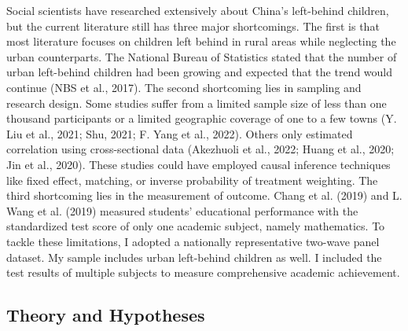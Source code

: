 \documentclass[
  man,floatsintext]{apa7}
\begin{document}
Social scientists have researched extensively about China's left-behind children, but the current literature still has three major shortcomings. The first is that most literature focuses on children left behind in rural areas while neglecting the urban counterparts. The National Bureau of Statistics stated that the number of urban left-behind children had been growing and expected that the trend would continue (NBS et al., 2017). The second shortcoming lies in sampling and research design. Some studies suffer from a limited sample size of less than one thousand participants or a limited geographic coverage of one to a few towns (Y. Liu et al., 2021; Shu, 2021; F. Yang et al., 2022). Others only estimated correlation using cross-sectional data (Akezhuoli et al., 2022; Huang et al., 2020; Jin et al., 2020). These studies could have employed causal inference techniques like fixed effect, matching, or inverse probability of treatment weighting. The third shortcoming lies in the measurement of outcome. Chang et al. (2019) and L. Wang et al. (2019) measured students' educational performance with the standardized test score of only one academic subject, namely mathematics. To tackle these limitations, I adopted a nationally representative two-wave panel dataset. My sample includes urban left-behind children as well. I included the test results of multiple subjects to measure comprehensive academic achievement.

\hypertarget{theory-and-hypotheses}{%
\subsection{Theory and Hypotheses}\label{theory-and-hypotheses}}
\end{document}
